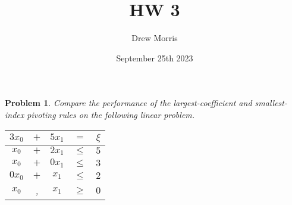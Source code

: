 \documentclass[12pt,oneside]{amsart}
\title{HW 3}
\author{Drew Morris}
\date{September 25th 2023}
\numberwithin{equation}{section}
\numberwithin{figure}{section}
\theoremstyle{plain}
\newtheorem{prob}{Problem}
\theoremstyle{definition}
\begin{document}
\maketitle

\renewcommand{\arraystretch}{1.5}

\begin{prob}
Compare the performance of the largest-coefficient and smallest-index pivoting 
rules on the following linear problem. \\
\begin{center}\begin{tabular}{|ccccc|}
  \hline
  $3x_0$ & $+$ & $5x_1$ & $=$    & $\xi$ \\
  \hline
  $x_0$  & $+$ & $2x_1$ & $\leq$ & $5$ \\
  $x_0$  & $+$ & $0x_1$ & $\leq$ & $3$ \\
  $0x_0$ & $+$ & $x_1$  & $\leq$ & $2$ \\
  $x_0$  & ,   & $x_1$  & $\geq$ & $0$ \\
  \hline
\end{tabular}\end{center}
\end{prob}
\end{document}
